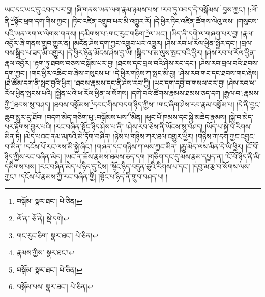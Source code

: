 ཡང་དང་ཡང་དུ་འབད་པར་བྱ། །ཞི་གནས་ཡན་ལག་རྣམ་ཉམས་པས། །རབ་ཏུ་འབད་དེ་བསྒོམས་\footnote{བསྒོམ་  སྣར་ཐང་།  པེ་ཅིན། }བྱས་ཀྱང་། །:ལོ་ནི་\footnote{ལོ་ན་  ཅོ་ནེ།  སྡེ་དགེ། }སྟོང་ཕྲག་དག་གིས་ཀྱང་། །ཏིང་འཛིན་འགྲུབ་པར་མི་འགྱུར་རོ། །དེ་ཕྱིར་ཏིང་འཛིན་ཚོགས་ལེའུ་ལས། །གསུངས་པའི་ཡན་ལག་ལ་ལེགས་གནས། །དམིགས་པ་:གང་རུང་གཅིག་\footnote{གང་རུང་ཅིག་  སྣར་ཐང་།  པེ་ཅིན། }ལ་ཡང་། །ཡིད་ནི་དགེ་ལ་གཞག་པར་བྱ། །རྣལ་འབྱོར་ཞི་གནས་གྲུབ་གྱུར་ན། །མངོན་ཤེས་དག་ཀྱང་འགྲུབ་པར་འགྱུར། །ཤེས་རབ་ཕ་རོལ་ཕྱིན་སྦྱོར་དང་། །བྲལ་བས་སྒྲིབ་པ་ཟད་མི་འགྱུར། །དེ་ཕྱིར་ཉོན་མོངས་ཤེས་བྱ་ཡི། །སྒྲིབ་པ་མ་ལུས་སྤང་བའི་ཕྱིར། །ཤེས་རབ་ཕ་རོལ་ཕྱིན་རྣལ་འབྱོར། །རྟག་ཏུ་ཐབས་བཅས་བསྒོམ་པར་བྱ། །ཐབས་དང་བྲལ་བའི་ཤེས་རབ་དང་། །ཤེས་རབ་བྲལ་བའི་ཐབས་དག་ཀྱང་། །གང་ཕྱིར་འཆིང་བ་ཞེས་གསུངས་པ། །དེ་ཕྱིར་གཉིས་ཀ་སྤང་མི་བྱ། །ཤེས་རབ་གང་དང་ཐབས་གང་ཞེས། །ཐེ་ཚོམ་དག་ནི་སྤང་བྱའི་ཕྱིར། །ཐབས་རྣམས་དང་ནི་ཤེས་རབ་ཀྱི། །ཡང་དག་དབྱེ་བ་གསལ་བར་བྱ། །ཤེས་རབ་ཕ་རོལ་ཕྱིན་སྤངས་པའི། །སྦྱིན་པའི་ཕ་རོལ་ཕྱིན་ལ་སོགས། །དགེ་བའི་ཚོགས་རྣམས་ཐམས་ཅད་དག །རྒྱལ་བ་:རྣམས་ཀྱི་\footnote{རྣམས་ཀྱིས་  སྣར་ཐང་། }ཐབས་སུ་བཤད། །ཐབས་བསྒོམས་\footnote{བསྒོམ་  སྣར་ཐང་།  པེ་ཅིན། }དབང་གིས་བདག་ཉིད་ཀྱིས། །གང་ཞིག་ཤེས་རབ་རྣམ་བསྒོམ་པ། །དེ་ནི་བྱང་ཆུབ་མྱུར་དུ་ཐོབ། །བདག་མེད་གཅིག་པུ་:བསྒོམས་པས་\footnote{བསྒོམ་པས་  སྣར་ཐང་།  པེ་ཅིན། }མིན། །ཕུང་པོ་ཁམས་དང་སྐྱེ་མཆེད་རྣམས། །སྐྱེ་བ་མེད་པར་རྟོགས་གྱུར་པའི། །རང་བཞིན་སྟོང་ཉིད་ཤེས་པ་ནི། །ཤེས་རབ་ཅེས་ནི་ཡོངས་སུ་བཤད། །ཡོད་པ་སྐྱེ་བ་རིགས་མིན་ཏེ། །མེད་པའང་ནམ་མཁའི་མེ་ཏོག་བཞིན། །ཉེས་པ་གཉིས་ཀར་ཐལ་འགྱུར་ཕྱིར། །གཉིས་ཀ་དག་ཀྱང་འབྱུང་བ་མིན། །དངོས་པོ་རང་ལས་མི་སྐྱེ་ཞིང་། །གཞན་དང་གཉིས་ཀ་ལས་ཀྱང་མིན། །རྒྱུ་མེད་ལས་མིན་དེ་ཡི་ཕྱིར། །ངོ་བོ་ཉིད་ཀྱིས་རང་བཞིན་མེད། །ཡང་ན་ཆོས་རྣམས་ཐམས་ཅད་དག །གཅིག་དང་དུ་མས་རྣམ་དཔྱད་ན། །ངོ་བོ་ཉིད་ནི་མི་དམིགས་པས། །རང་བཞིན་མེད་པ་ཉིད་དུ་ངེས། །སྟོང་ཉིད་བདུན་ཅུའི་རིགས་པ་དང་། །དབུ་མ་རྩ་བ་སོགས་ལས་ཀྱང་། །དངོས་པོ་རྣམས་ཀྱི་རང་བཞིན་གྱི། །སྟོང་པ་ཉིད་ནི་གྲུབ་བཤད་པ། །
